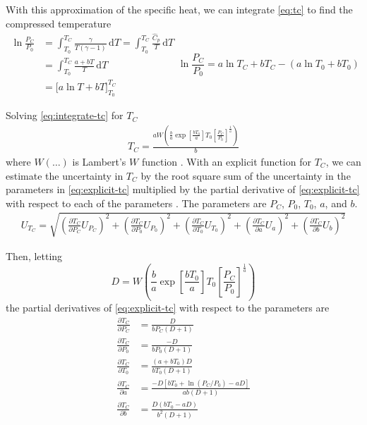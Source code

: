 \documentclass[../main.tex]{subfiles}
\begin{document}
With this approximation of the specific heat, we can integrate \cref{eq:tc}
to find the compressed temperature
%
\begin{subequations}
\begin{align}
\ln{\frac{P_C}{P_0}} &= \int_{T_0}^{T_{C}} \! \frac{\gamma}{T\left(\gamma-1\right)} \, \mathrm{d} T
                      = \int_{T_0}^{T_{C}} \! \frac{\hat{C}_p}{T} \, \mathrm{d} T \\
&= \int_{T_0}^{T_{C}} \! \frac{a + b T}{T} \, \mathrm{d} T\\
&= \Big[a \ln{T} + b T \Big]_{T_0}^{T_C}
\end{align}
\begin{equation}
\ln{\frac{P_C}{P_0}} = a \ln{T_C} + b T_C - \left(a \ln{T_0} + b T_0\right) \label{eq:integrate-tc}
\end{equation}
\end{subequations}

Solving \cref{eq:integrate-tc} for $T_C$
%
\begin{align}
\label{eq:explicit-tc}
T_C = \frac{a W\!\left(\frac{b}{a} \exp\!{\left[\frac{b T_0}{a}\right]} T_0 \left[\frac{P_C}{P_0}\right]^{\frac{1}{a}}\right)}{b}
\end{align}
%
where $W(\ldots)$ is Lambert's $W$ function \cite{Corless1996}. With an explicit function for $T_C$, we can
estimate the uncertainty in $T_C$ by the root square sum of the uncertainty in the parameters in
\cref{eq:explicit-tc} multiplied by the partial derivative of \cref{eq:explicit-tc} with
respect to each of the parameters \cite{Taylor1982}. The parameters are $P_C$, $P_0$, $T_0$, $a$, and $b$.
%
\begin{align}
\label{eq:tc-unc}
U_{T_C} = \sqrt{\left(\frac{\partial T_C}{\partial P_C} U_{P_C}\right)^2 + \left(\frac{\partial T_C}{\partial P_0} U_{P_0}\right)^2 +
                \left(\frac{\partial T_C}{\partial T_0} U_{T_0}\right)^2 + \left(\frac{\partial T_C}{\partial a} U_{a}\right)^2 +
                \left(\frac{\partial T_C}{\partial b} U_{b}\right)^2}
\end{align}

Then, letting
%
\begin{equation*}
D = W\!\left(\frac{b}{a} \exp\!{\left[\frac{b T_0}{a}\right]} T_0 \left[\frac{P_C}{P_0}\right]^{\frac{1}{a}}\right)
\end{equation*}
%
the partial derivatives of \cref{eq:explicit-tc} with respect to the parameters are
%
\begin{subequations}
\begin{align}
\frac{\partial T_C}{\partial P_C} &= \frac{D}{b P_C \left(D + 1\right)} \\
\frac{\partial T_C}{\partial P_0} &= \frac{-D}{b P_0 \left(D + 1\right)} \\
\frac{\partial T_C}{\partial T_0} &= \frac{\left(a + b T_0\right) D}{b T_0 \left(D + 1\right)} \\
\frac{\partial T_C}{\partial a} &= \frac{-D \left[b T_0 + \ln{\left(P_C/P_0\right)} - a D\right]}{a b \left(D + 1\right)} \\
\frac{\partial T_C}{\partial b} &= \frac{D\left(b T_0 - a D\right)}{{b}^2\left(D + 1\right)}
\end{align}
\end{subequations}
\end{document}
